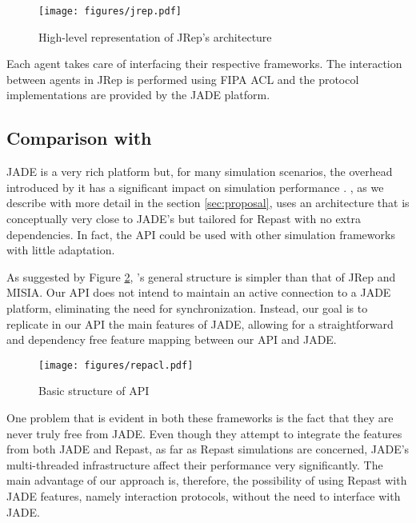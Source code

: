 \begin{figure}
	\centering
	\texttt{[image: figures/jrep.pdf]}
	\caption{High-level representation of JRep's architecture}
	\label{fig:jrep}
\end{figure}

Each agent takes care of interfacing their respective frameworks. The interaction between agents in JRep is performed using FIPA ACL and the protocol implementations are provided by the JADE platform.


\subsection{Comparison with \apiname{}}

JADE is a very rich platform but, for many simulation scenarios, the overhead introduced by it has a significant impact on simulation performance \cite{mengistu2008scalability}. \apiname{}, as we describe with more detail in the section \ref{sec:proposal}, uses an architecture that is conceptually very close to JADE's but tailored for Repast with no extra dependencies. In fact, the API could be used with other simulation frameworks with little adaptation.

As suggested by Figure \ref{fig:related-repacl}, \apiname{}'s general structure is simpler than that of JRep and MISIA. Our API does not intend to maintain an active connection to a JADE platform, eliminating the need for synchronization. Instead, our goal is to replicate in our API the main features of JADE, allowing for a straightforward and dependency free feature mapping between our API and JADE.

\begin{figure}
	\centering
	\texttt{[image: figures/repacl.pdf]}
	\caption{Basic structure of \apiname{} API}
	\label{fig:related-repacl}
\end{figure}

One problem that is evident in both these frameworks is the fact that they are never truly free from JADE. Even though they attempt to integrate the features from both JADE and Repast, as far as Repast simulations are concerned, JADE's multi-threaded infrastructure affect their performance very significantly. The main advantage of our approach is, therefore, the possibility of using Repast with JADE features, namely interaction protocols, without the need to interface with JADE.
